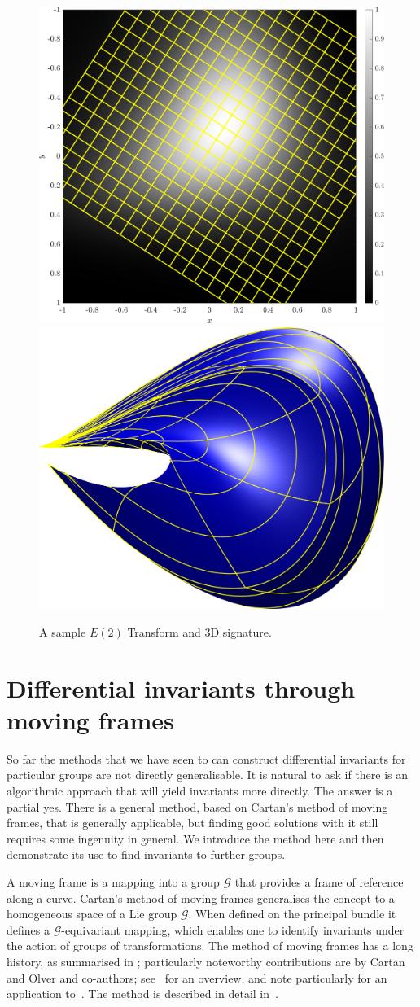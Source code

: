 \documentclass[review,onefignum,onetabnum]{siamonline190516}
\begin{document}
{\begin{figure}
\centering
\includegraphics[width=.45\textwidth]{Figs/f_transformed_E2.png}
\includegraphics[width=.45\textwidth]{Figs/E2_signature.png}
\caption{A sample $E(2)$ Transform and 3D signature.}
\label{fig:E2}
\end{figure}

\section{Differential invariants through moving frames}\label{sec:movingframes}

So far the methods that we have seen to can construct differential invariants for particular groups are not directly generalisable. It is natural to ask if there is an algorithmic approach that will yield invariants more directly. The answer is a partial yes. There is a general method, based on Cartan's method of moving frames, that is generally applicable, but finding good solutions with it still requires some ingenuity in general. We introduce the method here and then demonstrate its use to find invariants to further groups.

A moving frame is a mapping into a group $\mathcal{G}$ that provides a frame of reference along a curve. Cartan's method of moving frames generalises the concept to a homogeneous space of a Lie group $\mathcal{G}$. When defined on the principal bundle it defines a $\mathcal{G}$-equivariant mapping, which enables one to identify invariants under the action of groups of transformations. The method of moving frames has a long history, as summarised in \cite{Olver14}; particularly noteworthy contributions are by Cartan~\cite{Cartan37} and Olver and co-authors; see~\cite{Olver14} for an overview, and note particularly for an application to~\cite{Calabi98}. The method is described in detail in~\cite{OlverCIT}.

}
\end{document}
